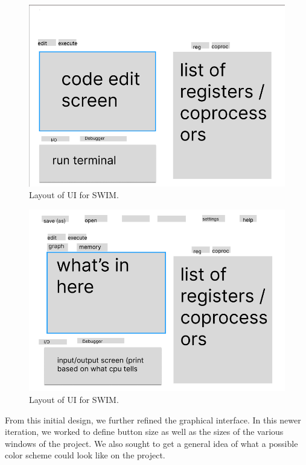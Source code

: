 \documentclass[
    paper=letter,
    parskip=half,
    fontsize=12pt,
    titlepage=firstiscover,
    toc=bibliography,
    numbers=endperiod
]{scrartcl}
\begin{document}
\begin{figure}[H]
    \includegraphics[width=\textwidth]{ui-prototype-1}
    \caption{Layout of UI for SWIM.}
\end{figure}

\begin{figure}[H]
    \includegraphics[width=\textwidth]{ui-prototype-2}
    \caption{Layout of UI for SWIM.}
\end{figure}

From this initial design, we further refined the graphical interface. In
this newer iteration, we worked to define button size as well as the
sizes of the various windows of the project. We also sought to get a
general idea of what a possible color scheme could look like on the
project.
\end{document}
